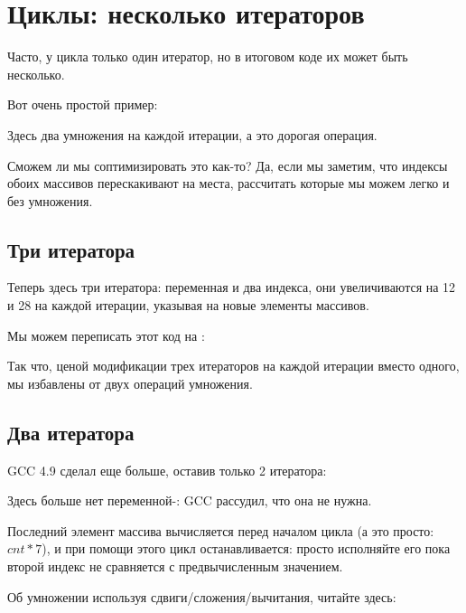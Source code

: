 ﻿\section{Циклы: несколько итераторов}
\label{loop_iterators}

Часто, у цикла только один итератор, но в итоговом коде их может быть несколько.

Вот очень простой пример:



Здесь два умножения на каждой итерации, а это дорогая операция.

Сможем ли мы соптимизировать это как-то?
Да, если мы заметим, что индексы обоих массивов перескакивают на места, рассчитать которые мы
можем легко и без умножения.

\subsection{Три итератора}



Теперь здесь три итератора: переменная  и два индекса, они увеличиваются на 12 и 28 на каждой
итерации, указывая на новые элементы массивов.

Мы можем переписать этот код на \CCpp:



Так что, ценой модификации трех итераторов на каждой итерации вместо одного, 
мы избавлены от двух операций умножения.

\subsection{Два итератора}

GCC 4.9 сделал еще больше, оставив только 2 итератора:



Здесь больше нет переменной-: GCC рассудил, что она не нужна.

Последний элемент массива  вычисляется перед началом цикла (а это просто: $cnt*7$),
и при помощи этого цикл останавливается: просто исполняйте его пока второй индекс не сравняется
с предвычисленным значением.

Об умножении используя сдвиги/сложения/вычитания, читайте здесь:
 
